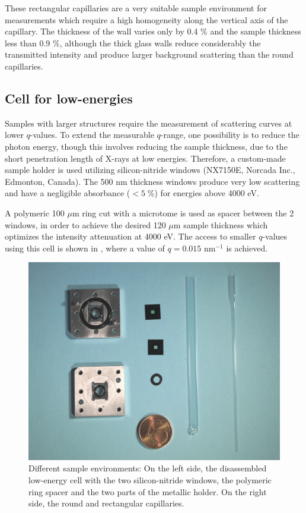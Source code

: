 These rectangular capillaries are a very suitable sample environment for measurements which require a high homogeneity along the vertical axis of the capillary. The thickness of the wall varies only by 0.4 $\%$ and the sample thickness less than 0.9 $\%$, although the thick glass walls reduce considerably the transmitted intensity and produce larger background scattering than the round capillaries.

\subsection{Cell for low-energies}

Samples with larger structures require the measurement of scattering curves at lower $q$-values. To extend the measurable $q$-range, one possibility is to reduce the photon energy, though this involves reducing the sample thickness, due to the short penetration length of X-rays at low energies. Therefore, a custom-made sample holder is used utilizing silicon-nitride windows (NX7150E, Norcada Inc., Edmonton, Canada). The 500 nm thickness windows produce very low scattering and have a negligible absorbance ($<5\;\%$) for energies above 4000 eV.

A polymeric 100 $\mu$m ring cut with a microtome is used as spacer between the 2 windows, in order to achieve the desired 120 $\mu$m sample thickness which optimizes the intensity attenuation at 4000 eV. The access to smaller $q$-values using this cell is shown in \cite{varga_towards_2014}, where a value of $q=0.015$ nm$^{-1}$ is achieved.

\begin{figure}%
		\includegraphics[width=0.8\linewidth]{Figures/SampleEnvironment.jpg}
		\caption[Sample environments for SAXS experiments in vacuum.]{Different sample environments: On the left side, the disassembled low-energy cell with the two silicon-nitride windows, the polymeric ring spacer and the two parts of the metallic holder. On the right side, the round and rectangular capillaries.}
	        \label{fig:SampleEnvironment}
\end{figure}

